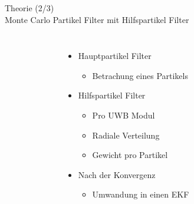 \documentclass{beamer}
\begin{document}
\begin{frame}{Theorie (2/3)\\Monte Carlo Partikel Filter mit Hilfspartikel Filter}
\begin{columns}
\begin{overlayarea}{\textwidth}{.7\textheight}
{\begin{figure}
						\caption{\cite{blanco2008pure}}
					\end{figure}
				}
			\end{overlayarea}		
			\begin{itemize}
				\item Hauptpartikel Filter
				\begin{itemize}
					\item Betrachung eines Partikels
				\end{itemize}
				\item Hilfspartikel Filter
				\begin{itemize}
					\item Pro UWB Modul
					\item Radiale Verteilung
					\item Gewicht pro Partikel
				\end{itemize}
				\item<4-> Nach der Konvergenz
				\begin{itemize}
					\item Umwandung in einen EKF
				\end{itemize}
			\end{itemize}
	\end{columns}
\end{frame}
\end{document}
